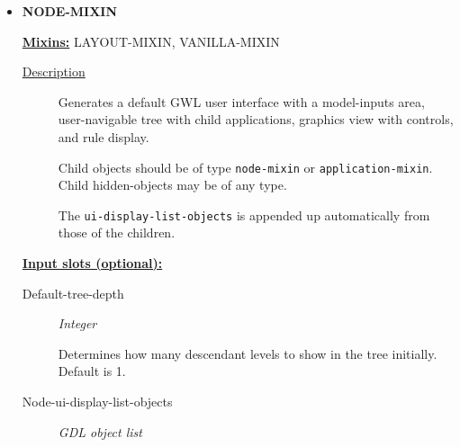 \documentclass [11pt]{book}
\begin{document}
\begin{itemize}







\item {}
\label{prim:node-mixin}
\textbf{NODE-MIXIN}


\textbf{
\underline{Mixins:}} LAYOUT-MIXIN, VANILLA-MIXIN





\begin{description}

\item [
\underline{Description}]


Generates a default GWL user interface with a model-inputs area,
user-navigable tree with child applications, graphics view with controls, and rule display. 

Child objects should be of type \texttt{node-mixin} or \texttt{application-mixin}. Child hidden-objects
may be of any type.

The \texttt{ui-display-list-objects} is appended up automatically from those of the children.



\end{description}








\textbf{
\underline{Input slots (optional):}}

\begin{description}

\item [Default-tree-depth]
\emph{Integer}

 Determines how many descendant levels to show in the tree initially. Default is 1.




\item [Node-ui-display-list-objects]
\emph{GDL object list}


\end{description}
\end{itemize}
\end{document}

